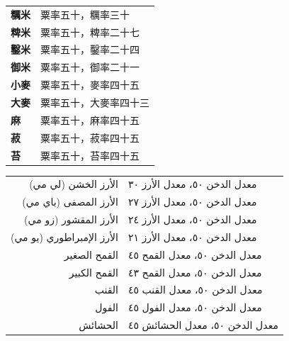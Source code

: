 \documentclass[11pt,a4paper]{article}
\newcommand{\ar}[1]{\arabicfont\beginR #1\endR}
\begin{document}
\noindent
\begin{minipage}[t]{0.46\textwidth}
\begin{flushleft}
\begin{tabular}{ll}
\toprule
\textbf{糲米} & 粟率五十，糲率三十 \\
\textbf{粺米} & 粟率五十，粺率二十七 \\
\textbf{鑿米} & 粟率五十，鑿率二十四 \\
\textbf{御米} & 粟率五十，御率二十一 \\
\textbf{小麥} & 粟率五十，麥率四十五 \\
\textbf{大麥} & 粟率五十，大麥率四十三 \\
\textbf{麻} & 粟率五十，麻率四十五 \\
\textbf{菽} & 粟率五十，菽率四十五 \\
\textbf{苔} & 粟率五十，苔率四十五 \\
\bottomrule
\end{tabular}
\end{flushleft}
\end{minipage}%
\hfill%
\begin{minipage}[t]{0.46\textwidth}
\begin{flushright}
\ar{
\begin{tabular}{rl}
\toprule
الأرز الخشن (لي مي) & معدل الدخن ٥٠، معدل الأرز ٣٠ \\
الأرز المصفى (باي مي) & معدل الدخن ٥٠، معدل الأرز ٢٧ \\
الأرز المقشور (زو مي) & معدل الدخن ٥٠، معدل الأرز ٢٤ \\
الأرز الإمبراطوري (يو مي) & معدل الدخن ٥٠، معدل الأرز ٢١ \\
القمح الصغير & معدل الدخن ٥٠، معدل القمح ٤٥ \\
القمح الكبير & معدل الدخن ٥٠، معدل القمح ٤٣ \\
القنب & معدل الدخن ٥٠، معدل القنب ٤٥ \\
الفول & معدل الدخن ٥٠، معدل الفول ٤٥ \\
الحشائش & معدل الدخن ٥٠، معدل الحشائش ٤٥ \\
\bottomrule
\end{tabular}}
\end{flushright}
\end{minipage}

\vspace{1em}
\end{document}
